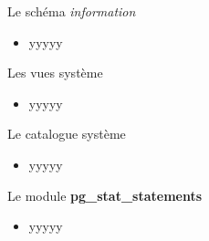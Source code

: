 
\begin{frame}[fragile]{Le schéma \textit{information}}


   \begin{itemize}
      \item yyyyy
   \end{itemize}

\begin{toile}
\end{toile}

\end{frame}


\begin{frame}[fragile]{Les vues système}


   \begin{itemize}
      \item yyyyy
   \end{itemize}

\begin{toile}
\end{toile}

\end{frame}


\begin{frame}[fragile]{Le catalogue système}


   \begin{itemize}
      \item yyyyy
   \end{itemize}

\begin{toile}
\end{toile}

\end{frame}


\begin{frame}[fragile]{Le module \textbf{pg\_stat\_statements}}


   \begin{itemize}
      \item yyyyy
   \end{itemize}

\begin{toile}
\end{toile}

\end{frame}

